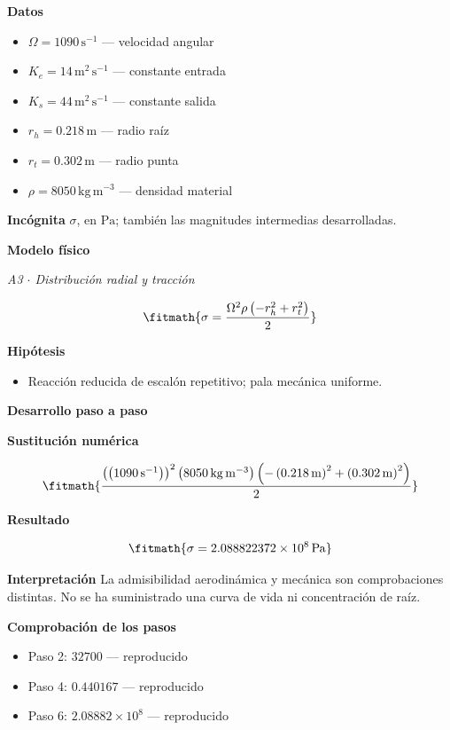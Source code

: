 \documentclass[10pt,openany]{book}
\begin{document}
\noindent\textbf{Datos}
\begin{itemize}
\item $\Omega = 1090\,\mathrm{s}^{-1}$ — velocidad angular
\item $K_e = 14\,\mathrm{m}^{2}\,\mathrm{s}^{-1}$ — constante entrada
\item $K_s = 44\,\mathrm{m}^{2}\,\mathrm{s}^{-1}$ — constante salida
\item $r_h = 0.218\,\mathrm{m}$ — radio raíz
\item $r_t = 0.302\,\mathrm{m}$ — radio punta
\item $\rho = 8050\,\mathrm{kg}\,\mathrm{m}^{-3}$ — densidad material
\end{itemize}

\noindent\textbf{Incógnita}
$\sigma$, en $\mathrm{Pa}$; también las magnitudes intermedias desarrolladas.

\noindent\textbf{Modelo físico}

\noindent\textit{A3 \(\cdot\) Distribución radial y tracción}

\[
\fitmath{\sigma=\frac{\Omega^{2} \rho \left(- r_h^{2} + r_t^{2}\right)}{2}}
\]

\noindent\textbf{Hipótesis}
\begin{itemize}
\item Reacción reducida de escalón repetitivo; pala mecánica uniforme.
\end{itemize}

\noindent\textbf{Desarrollo paso a paso}



\noindent\textbf{Sustitución numérica}

\[
\fitmath{\frac{\left(\left(1090\,\mathrm{s}^{-1}\right)\right)^{2} \left(8050\,\mathrm{kg}\,\mathrm{m}^{-3}\right) \left(- \left(0.218\,\mathrm{m}\right)^{2} + \left(0.302\,\mathrm{m}\right)^{2}\right)}{2}}
\]

\noindent\textbf{Resultado}

\[
\fitmath{\sigma=2.088822372\times10^{8}\,\mathrm{Pa}}
\]

\noindent\textbf{Interpretación}
La admisibilidad aerodinámica y mecánica son comprobaciones distintas. No se ha suministrado una curva de vida ni concentración de raíz.

\noindent\textbf{Comprobación de los pasos}
\begin{itemize}
\item Paso 2: $32700$ — reproducido
\item Paso 4: $0.440167$ — reproducido
\item Paso 6: $2.08882\times 10^{8}$ — reproducido
\end{itemize}
\end{document}
